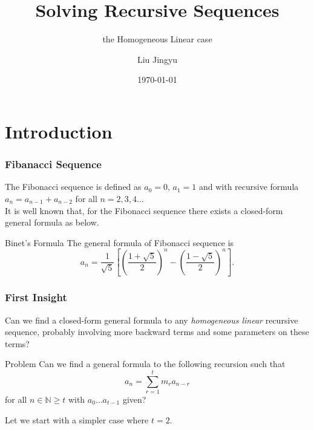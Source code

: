\documentclass{beamer}
\title{Solving Recursive Sequences}
\subtitle{the Homogeneous Linear case}
\author{Liu Jingyu}
\date{\today}
\theoremstyle{definition}
\theoremstyle{remark}
\begin{document}
\frame{\titlepage}
\section{Introduction}
\begin{frame}
  \frametitle{Fibanacci Sequence}
  The Fibonacci sequence is defined as $a_0 = 0$, $a_1 = 1$ and with 
  recursive formula $a_n = a_{n-1} + a_{n-2}$ for all $n=2,3,4\dots$ 
  \\
  It is well known that, for the Fibonacci sequence there 
  exists a closed-form general formula as below. 
  \\
  \begin{block}{Binet's Formula}
     The general formula of Fibonacci sequence is
     \[
       a_n = \frac{1}{\sqrt{5}} \left[\left(\frac{1+\sqrt{5}}{2}\right)^n
       -\left(\frac{1-\sqrt{5}}{2}\right)^n\right].
     \]
  \end{block}
\end{frame}
\begin{frame}
  \frametitle{First Insight}
  Can we find a closed-form general formula to any \emph{homogeneous linear} 
  recursive sequence, probably involving more backward terms and some 
  parameters on these terms?
  \begin{block}{Problem}
     Can we find a general formula to the following recursion such that 
     \[
       a_n = \sum_{r=1}^t m_r a_{n-r}
     \]
      for all $n \in \mathbb{N} \geq t$ with $a_0 \dots a_{t-1}$ given?
  \end{block}
  Let we start with a simpler case where $t = 2$. 
\end{frame}
\end{document}
